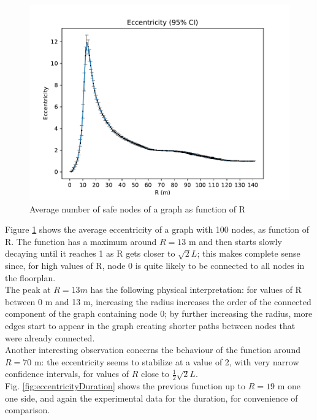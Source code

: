 \begin{figure}[H]
    \begin{center}
        \includegraphics[scale=.6]{img/graphAnalysisEccentricity.pdf}
    \end{center}
    \vspace*{-0.5cm}
    \caption{Average number of safe nodes of a graph as function of R}
    \label{fig:eccentricityFull}
\end{figure}
\hfill \break
Figure \ref{fig:eccentricityFull} shows the average eccentricity of a graph with 100 nodes, as function of R.
The function has a maximum around $R = 13$ m and then starts slowly decaying until it reaches 1 as R gets closer to $\sqrt{2}L$; this makes complete sense since, for high values of R, node 0 is quite likely to be connected to all nodes in the floorplan.\\
The peak at $R=13 m$ has the following physical interpretation: for values of R between 0 m and 13 m, increasing the radius increases the order of the connected component of the graph containing node 0; by further increasing the radius, more edges start to appear in the graph creating shorter paths between nodes that were already connected.\\
Another interesting observation concerns the behaviour of the function around $R = 70$ m: the eccentricity seems to stabilize at a value of 2, with very narrow confidence intervals, for values  of $R$ close to $\frac{1}{2}\sqrt{2}L$.\\
Fig. \ref{fig:eccentricityDuration} shows the previous function up to $R=19$ m one one side, and again the experimental data for the duration, for convenience of comparison.\\
